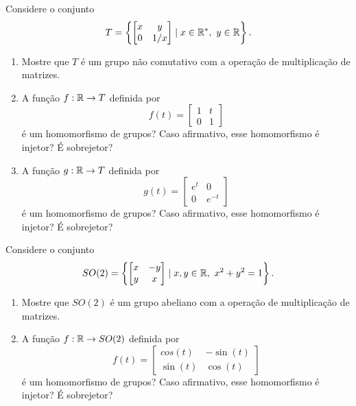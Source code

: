 \documentclass[12pt]{exam}
\begin{document}
    \vspace{.3cm}

    \questao{} Considere o conjunto
    \[
    T = \left\{\begin{bmatrix}x & y\\0 & 1/x\end{bmatrix} \mid x \in \mathbb{R}^*,\ y \in \mathbb{R}\right\}.
    \]
    \begin{enumerate}[label=({\alph*})]
        \item Mostre que $T$ é um grupo não comutativo com a operação de multiplicação de matrizes.

        \item A função $f : \mathbb{R} \to T$ definida por
        \[
        f(t) = \begin{bmatrix}1 & t\\0 & 1\end{bmatrix}
        \]
        é um homomorfismo de grupos? Caso afirmativo, esse homomorfismo é injetor? É sobrejetor?

        \item A função $g : \mathbb{R} \to T$ definida por
        \[
        g(t) = \begin{bmatrix}e^t & 0\\0 & e^{-t}\end{bmatrix}
        \]
        é um homomorfismo de grupos? Caso afirmativo, esse homomorfismo é injetor? É sobrejetor?
    \end{enumerate}

    \vspace{.3cm}

    \questao{} Considere o conjunto
    \[
    SO(2) = \left\{\begin{bmatrix}x & -y\\y & x\end{bmatrix} \mid x, y \in \mathbb{R},\ x^2 + y^2 = 1\right\}.
    \]
    \begin{enumerate}[label=({\alph*})]
        \item Mostre que $SO(2)$ é um grupo abeliano com a operação de multiplicação de matrizes.

        \item A função $f : \mathbb{R} \to SO(2)$ definida por
        \[
        f(t) = \begin{bmatrix}cos(t) & -\sin(t)\\\sin(t) & \cos(t)\end{bmatrix}
        \]
        é um homomorfismo de grupos? Caso afirmativo, esse homomorfismo é injetor? É sobrejetor?
    \end{enumerate}
\end{document}
